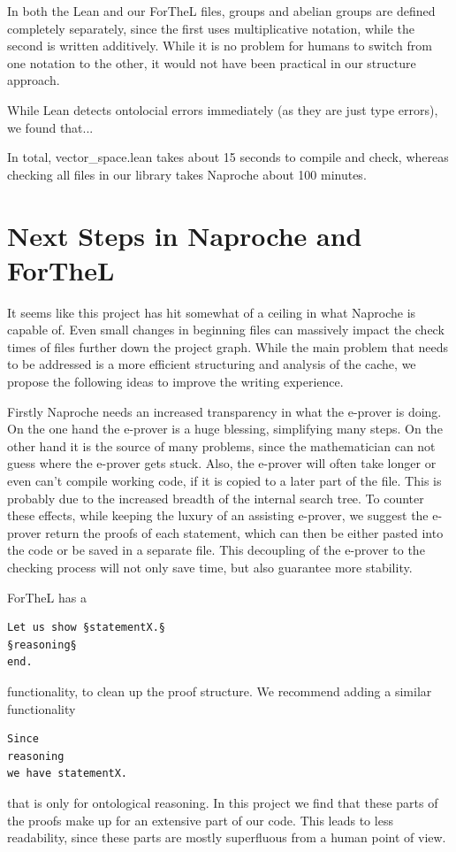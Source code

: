\documentclass[11pt]{article}
\begin{document}
In both the Lean and our ForTheL files, groups and abelian groups are defined completely separately, since the first uses multiplicative notation, while the second is written additively.
While it is no problem for humans to switch from one notation to the other, it would not have been practical in our {\ftl structure} approach.

While Lean detects ontolocial errors immediately (as they are just type errors), we found that...

In total, vector\_space.lean takes about 15 seconds to compile and check, whereas checking all files in our library takes Naproche about 100 minutes.


\newpage 
\section{Next Steps in Naproche and ForTheL}

It seems like this project has hit somewhat of a ceiling in what Naproche is capable of. 
Even small changes in beginning files can massively impact the check times of files further down the project graph.
While the main problem that needs to be addressed is a more efficient structuring and analysis of the cache, we propose the following ideas to improve the writing experience.

Firstly Naproche needs an increased transparency in what the e-prover is doing. On the one hand the e-prover is a huge blessing, simplifying many steps. On the other hand it is the source of many problems, since the mathematician can not guess where the e-prover gets stuck. Also, the e-prover will often take longer or even can't compile working code, if it is copied to a later part of the file. This is probably due to the increased breadth of the internal search tree. To counter these effects, while keeping the luxury of an assisting e-prover, we suggest the e-prover return the proofs of each statement, which can then be either pasted into the code or be saved in a separate file. This decoupling of the e-prover to the checking process will not only save time, but also guarantee more stability.

ForTheL has a 
\begin{lstlisting}
Let us show §statementX.§
§reasoning§
end.
\end{lstlisting} 
functionality, to clean up the proof structure. We recommend adding a similar functionality
\begin{lstlisting}
Since 
reasoning
we have statementX.
\end{lstlisting} 
that is only for ontological reasoning. In this project we find that these parts of the proofs make up for an extensive part of our code. This leads to less readability, since these parts are mostly superfluous from a human point of view.
\end{document}
